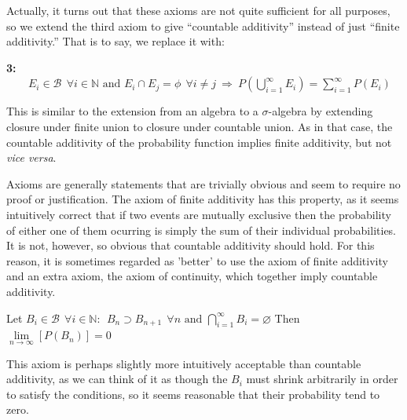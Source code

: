 \documentclass[12pt,a4paper]{article}
\begin{document}
Actually, it turns out that these axioms are not quite sufficient for all purposes, so we extend the third axiom to give ``countable additivity'' instead of just ``finite additivity.'' That is to say, we replace it with:\par
\vspace{10pt}
{\bf 3:} $\qquad E_i\in\mathcal{B}\:\:\forall i\in\mathbb{N}\text{ and }E_i\cap E_j=\phi\:\:\forall i\neq j\:\Rightarrow\:P(\bigcup_{i=1}^{\infty}E_i)=\sum_{i=1}^{\infty}P(E_i)$\par
\vspace{10pt}

This is similar to the extension from an algebra to a $\sigma$-algebra by extending closure under finite union to closure under countable union. As in that case, the countable additivity of the probability function implies finite additivity, but not {\it vice versa}.

Axioms are generally statements that are trivially obvious and seem to require no proof or justification. The axiom of finite additivity has this property, as it seems intuitively correct that if two events are mutually exclusive then the probability of either one of them ocurring is simply the sum of their individual probabilities. It is not, however, so obvious that countable additivity should hold. For this reason, it is sometimes regarded as 'better' to use the axiom of finite additivity and an extra axiom, the axiom of continuity, which together imply countable additivity.\par
\vspace{12pt}

 Let $B_i\in\mathcal{B}\:\:\forall i\in\mathbb{N}:\:\:B_n\supset B_{n+1}\:\:\forall n \text{ and }\bigcap\limits_{i=1}^{\infty}B_i=\varnothing$ Then $\lim\limits_{n\rightarrow\infty}[P(B_n)]=0$\par
\vspace{12pt}

This axiom is perhaps slightly more intuitively acceptable than countable additivity, as we can think of it as though the $B_i$ must shrink arbitrarily in order to satisfy the conditions, so it seems reasonable that their probability tend to zero.
\end{document}
